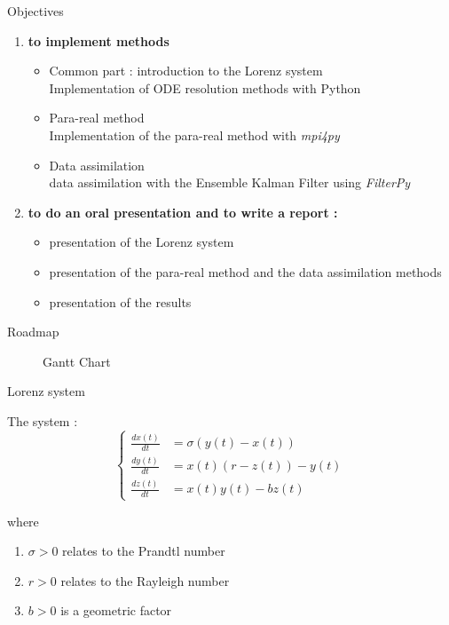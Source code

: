 \documentclass[10pt,xcolor={table,dvipsnames},t]{beamer}
\begin{document}
\begin{frame}[allowframebreaks]{Objectives}
		\begin{enumerate}[\textbullet]
			\item \textbf{to implement methods} 
			\begin{itemize}
				\item Common part : introduction to the Lorenz system \\
				\quad Implementation of ODE resolution methods with Python
				\item Para-real method \\
				\quad Implementation of the para-real method with \textit{mpi4py}
				\item Data assimilation \\
				\quad data assimilation with the Ensemble Kalman Filter using \textit{FilterPy}
			\end{itemize}
			\item \textbf{to do an oral presentation and to write a report :}
			\begin{itemize}
				\item presentation of the Lorenz system
				\item presentation of the para-real method and the data assimilation methods
				\item presentation of the results
			\end{itemize}
		\end{enumerate}
	\end{frame}
	
	\begin{frame}{Roadmap}
	   	\begin{figure}
	   	  \centering
        	\caption{Gantt Chart}
		\end{figure}
		
	\end{frame}
	
	
	\begin{frame}{Lorenz system}
		
		The system :
		$$\left\{\begin{aligned} 
			\frac{d x(t)}{d t} &=\sigma(y(t)-x(t))\\
			\frac{d y(t)}{d t}&=x(t)(r-z(t))-y(t) \\
			\frac{d z(t)}{d t}&=x(t)y(t)-bz(t)
		\end{aligned}\right.$$
	
		where
		
		\begin{enumerate}[\textbullet]
			\item $\sigma > 0$  relates to the Prandtl number
			\item $r > 0$  relates to the Rayleigh number
			\item $b > 0$ is a geometric factor
		\end{enumerate}
		
	\end{frame}
\end{document}
